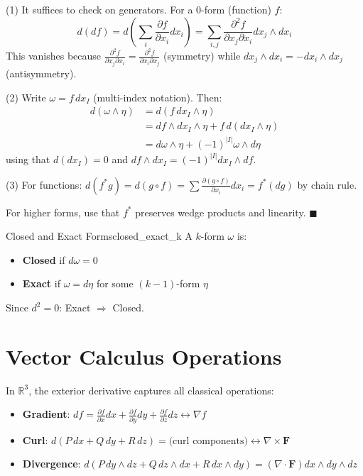 \documentclass[11pt, letterpaper, openany]{book}
\renewenvironment{proof}[1][\proofname]{%
  \tcolorbox[blanker, breakable, left=1em,
    before skip=1em, after skip=1em,
    borderline west={2pt}{0pt}{MagicTeal!50},
    colback=MagicCream,
    before upper={\textcolor{MagicTeal}{\sffamily\bfseries #1.}\space}
  ]%
}{%
  \hfill\textcolor{MagicTeal}{\ensuremath{\blacksquare}}\endtcolorbox%
}
\begin{document}
\begin{proof}
(1) It suffices to check on generators. For a 0-form (function) $f$:
\[d(df) = d\left(\sum_i \frac{\partial f}{\partial x_i} dx_i\right) = \sum_{i,j} \frac{\partial^2 f}{\partial x_j \partial x_i} dx_j \wedge dx_i\]
This vanishes because $\frac{\partial^2 f}{\partial x_j \partial x_i} = \frac{\partial^2 f}{\partial x_i \partial x_j}$ (symmetry) while $dx_j \wedge dx_i = -dx_i \wedge dx_j$ (antisymmetry).

(2) Write $\omega = f \, dx_I$ (multi-index notation). Then:
\begin{align*}
d(\omega \wedge \eta) &= d(f \, dx_I \wedge \eta) \\
&= df \wedge dx_I \wedge \eta + f \, d(dx_I \wedge \eta) \\
&= d\omega \wedge \eta + (-1)^{|I|} \omega \wedge d\eta
\end{align*}
using that $d(dx_I) = 0$ and $df \wedge dx_I = (-1)^{|I|} dx_I \wedge df$.

(3) For functions: $d(f^*g) = d(g \circ f) = \sum \frac{\partial(g \circ f)}{\partial x_i} dx_i = f^*(dg)$ by chain rule.

For higher forms, use that $f^*$ preserves wedge products and linearity.
\end{proof}

\begin{defn}{Closed and Exact Forms}{closed_exact_k}
A $k$-form $\omega$ is:
\begin{itemize}
    \item \textbf{Closed} if $d\omega = 0$
    \item \textbf{Exact} if $\omega = d\eta$ for some $(k-1)$-form $\eta$
\end{itemize}
Since $d^2 = 0$: Exact $\Rightarrow$ Closed.
\end{defn}

\section{Vector Calculus Operations}

In $\mathbb{R}^3$, the exterior derivative captures all classical operations:

\begin{itemize}
    \item \textbf{Gradient}: $df = \frac{\partial f}{\partial x}dx + \frac{\partial f}{\partial y}dy + \frac{\partial f}{\partial z}dz \leftrightarrow \nabla f$
    \item \textbf{Curl}: $d(P\,dx + Q\,dy + R\,dz) = \text{(curl components)} \leftrightarrow \nabla \times \mathbf{F}$
    \item \textbf{Divergence}: $d(P\,dy \wedge dz + Q\,dz \wedge dx + R\,dx \wedge dy) = (\nabla \cdot \mathbf{F}) dx \wedge dy \wedge dz$
\end{itemize}
\end{document}
